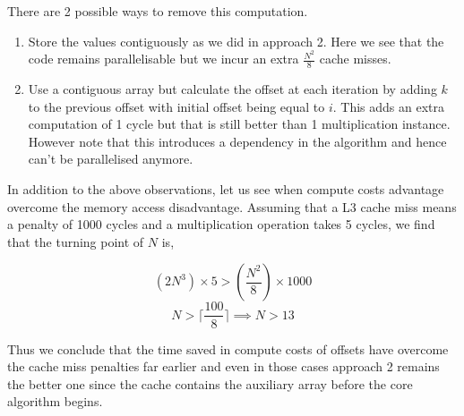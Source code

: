\documentclass{article}
\begin{document}
There are 2 possible ways to remove this computation.
\begin{enumerate}
    \item Store the values contiguously as we did in approach 2. Here we see that the code remains parallelisable but we incur an extra $\frac{N^2}{8}$ cache misses.
    \item Use a contiguous array but calculate the offset at each iteration by adding $k$ to the previous offset with initial offset being equal to $i$. This adds an extra computation of 1 cycle but that is still better than 1 multiplication instance. However note that this introduces a dependency in the algorithm and hence can't be parallelised anymore. 
\end{enumerate}
In addition to the above observations, let us see when compute costs advantage overcome the memory access disadvantage. Assuming that a L3 cache miss means a penalty of 1000 cycles and a multiplication operation takes 5 cycles, we find that the turning point of $N$ is,

$$(2N^3) \times 5 > (\frac{N^2}{8}) \times 1000$$
$$N > \lceil \frac{100}{8} \rceil \implies N > 13$$

Thus we conclude that the time saved in compute costs of offsets have overcome the cache miss penalties far earlier and even in those cases approach 2 remains the better one since the cache contains the auxiliary array before the core algorithm begins.
\end{document}
